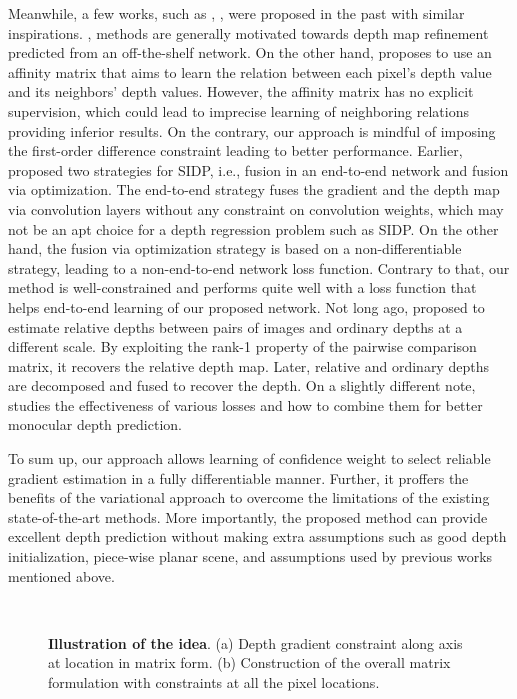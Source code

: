 \documentclass{article} \usepackage{iclr2023_conference, times}
\begin{document}
Meanwhile, a few works, such as  \citet{ramamonjisoa2020predicting}, \citet{cheng2018depth}, \citet{li2017two}  were proposed in the past with similar inspirations.  \citet{ramamonjisoa2020predicting}, \citet{cheng2018depth} methods are generally motivated towards depth map refinement predicted from an off-the-shelf network. On the other hand, \citet{cheng2018depth} proposes to use an affinity matrix that aims to learn the relation between each pixel's depth value and its neighbors' depth values. However, the affinity matrix has no explicit supervision, which could lead to imprecise learning of neighboring relations providing inferior results.
On the contrary, our approach is mindful of imposing the first-order difference constraint leading to better performance. Earlier, \citet{li2017two} proposed two strategies for SIDP, i.e., fusion in an end-to-end network and fusion via optimization. The end-to-end strategy fuses the gradient and the depth map via convolution layers without any constraint on convolution weights, which may not be an apt choice for a depth regression problem such as SIDP. On the other hand, the fusion via optimization strategy is based on a non-differentiable strategy, leading to a non-end-to-end network loss function. Contrary to that, our method is well-constrained and performs quite well with a loss function that helps end-to-end learning of our proposed network. Not long ago, \citet{lee2019monocular} proposed to estimate relative depths between pairs of images and ordinary depths at a different scale. By exploiting the rank-1 property of the pairwise comparison matrix, it recovers the relative depth map. Later, relative and ordinary depths are decomposed and fused to recover the depth. On a slightly different note, \citet{lee2020multi} studies the effectiveness of various losses and how to combine them for better monocular depth prediction.


To sum up, our approach allows learning of confidence weight to select reliable gradient estimation in a fully differentiable manner. Further, it proffers the benefits of the variational approach to overcome the limitations of the existing state-of-the-art methods. More importantly, the proposed method can provide excellent depth prediction without making extra assumptions such as good depth initialization, piece-wise planar scene, and assumptions used by previous works mentioned above.



\begin{figure}[t]
\centering
{}
~~~
\caption{\small \textbf{Illustration of the idea}. (a) Depth gradient constraint along  axis at location  in  matrix form. (b) Construction of the overall matrix formulation with constraints at all the pixel locations.}
\label{fig:dni}
\end{figure}
\end{document}
